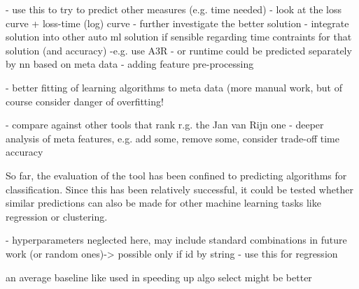 - use this to try to predict other measures (e.g. time needed)
- look at the loss curve + loss-time (log) curve
- further investigate the better solution
- integrate solution into other auto ml solution if sensible regarding time contraints for that solution (and accuracy)
-e.g. use A3R
- or runtime could be predicted separately by nn based on meta data \cite{DBLP:journals/corr/abs-1709-07615}
- adding feature pre-processing

- better fitting of learning algorithms to meta data (more manual work, but of course consider danger of overfitting!

- compare against other tools that rank r.g. the Jan van Rijn one
- deeper analysis of meta features, e.g. add some, remove some, consider trade-off time accuracy

So far, the evaluation of the tool has been confined to predicting algorithms for classification. Since this has been relatively successful, it could be tested whether similar predictions can also be made for other machine learning tasks like regression or clustering. 

- hyperparameters neglected here, may include standard combinations in future work (or random ones)-> possible only if id by string
- use this for regression

an average baseline like used in speeding up algo select might be better